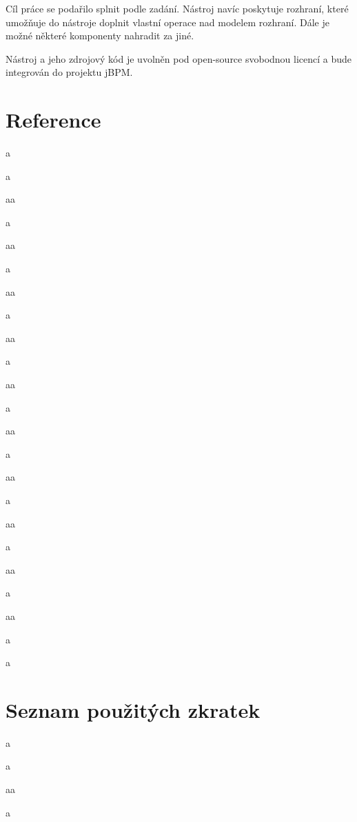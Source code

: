 \documentclass[11pt,twoside,a4paper]{book}
\begin{document}
Cíl práce se podařilo splnit podle zadání. Nástroj navíc poskytuje rozhraní, které umožňuje do
nástroje doplnit vlastní operace nad modelem rozhraní. Dále je možné některé komponenty
nahradit za jiné.

Nástroj a jeho zdrojový kód je uvolněn pod open-source svobodnou licencí a bude integrován
do projektu jBPM.

\chapter{Reference}
a

a

aa

a

aa

a

aa

a

aa

a

aa

a

aa

a

aa

a

aa

a

aa

a 

aa

a

a


%

\appendix

\chapter{Seznam použitých zkratek}
a

a

aa

a
\end{document}
